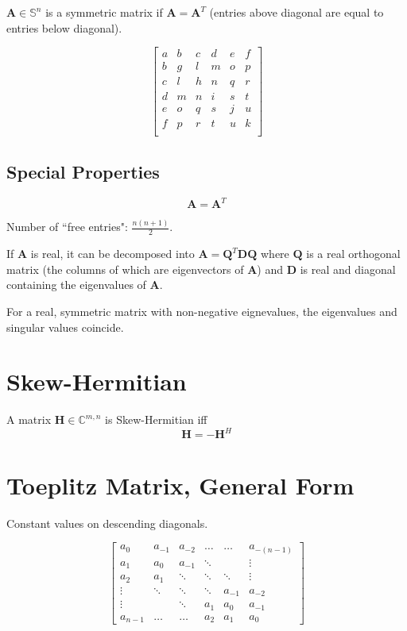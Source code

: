 \documentclass{book}
\newcommand{\mA}{\mathbf{A}}
\newcommand{\mD}{\mathbf{D}}
\newcommand{\mH}{\mathbf{H}}
\newcommand{\mQ}{\mathbf{Q}}
\newcommand{\sCmn}{\mathbb{C}^{m,n}}
\newcommand{\sSn}{\mathbb{S}^{n}}
\begin{document}
$\mA\in\sSn$ is a symmetric matrix if $\mA=\mA^T$ (entries above diagonal are equal to entries below diagonal).

\begin{equation}
\begin{bmatrix}
a & b & c & d & e & f \\
b & g & l & m & o & p \\
c & l & h & n & q & r \\
d & m & n & i & s & t \\
e & o & q & s & j & u \\
f & p & r & t & u & k \\
\end{bmatrix}
\end{equation}


\subsection*{Special Properties}

\begin{equation}
\mA=\mA^T
\end{equation}

Number of ``free entries": $\frac{n(n+1)}{2}$.

If $\mA$ is real, it can be decomposed into $\mA=\mQ^T\mD\mQ$ where $\mQ$ is a real orthogonal matrix (the columns of which are eigenvectors of $\mA$) and $\mD$ is real and diagonal containing the eigenvalues of $\mA$.

For a real, symmetric matrix with non-negative eignevalues, the eigenvalues and singular values coincide.



\section{Skew-Hermitian}
A matrix $\mH\in\sCmn$ is Skew-Hermitian iff
\begin{equation}
\mH=-\mH^H
\end{equation}



\section{Toeplitz Matrix, General Form}

Constant values on descending diagonals.

\begin{equation}
\begin{bmatrix}
  a_{0} & a_{-1} & a_{-2} & \ldots  & \ldots & a_{-(n-1)}  \\
  a_{1} & a_0    & a_{-1} & \ddots  &        & \vdots \\
  a_{2} & a_{1}  & \ddots & \ddots  & \ddots & \vdots \\ 
 \vdots & \ddots & \ddots & \ddots  & a_{-1} & a_{-2}\\
 \vdots &        & \ddots & a_{1}   & a_{0}  & a_{-1} \\
a_{n-1} & \ldots & \ldots & a_{2}   & a_{1}  & a_{0}
\end{bmatrix}
\end{equation}
\end{document}
